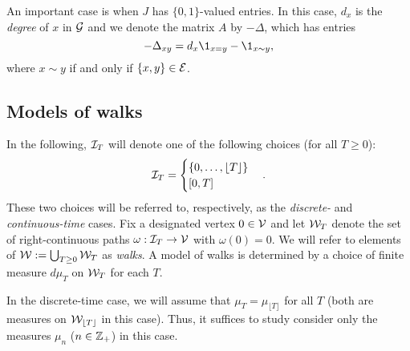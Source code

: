 An important case is when $J$ has $\{0, 1 \}$-valued entries. In this case, $d_x$ is the
\emph{degree} of $x$ in $\mathcal{G}$ and we denote the matrix $A$ by $-\Delta$, which has
entries
\begin{equation}
-\Delta_{xy} = d_x \1_{x=y} - \1_{x \sim y},
\end{equation}
where $x \sim y$ if and only if $\{ x, y \} \in \mathcal{E}$.




\subsection{Models of walks}

In the following, $\mathcal{I}_T$ will denote one of the following choices (for all $T \ge 0$):
\begin{equation}
\mathcal{I}_T
  =
\begin{cases}
\{ 0, \ldots, \lfloor T \rfloor \} \\
[0, T]
\end{cases}.
\end{equation}
These two choices will be referred to, respectively, as the \emph{discrete-} and
\emph{continuous-time} cases.
Fix a designated vertex $0 \in \mathcal{V}$ and
let $\mathcal{W}_T$ denote the set of
right-continuous paths $\omega : \mathcal{I}_T \rightarrow \mathcal{V}$ with $\omega(0) = 0$.
We will refer to elements of $\mathcal{W} := \bigcup_{T \geq 0} \mathcal{W}_T$ as \emph{walks}.
A model of walks is determined by a choice of finite measure $d\mu_T$ on
$\mathcal{W}_T$ for each $T$.

In the discrete-time case, we will assume that
$\mu_T = \mu_{\lfloor T \rfloor}$ for all $T$ (both are measures on
$\mathcal{W}_{\lfloor T \rfloor}$ in this case). Thus, it suffices to study consider only
the measures $\mu_n$ ($n \in {\mathbb Z}_+$) in this case.

